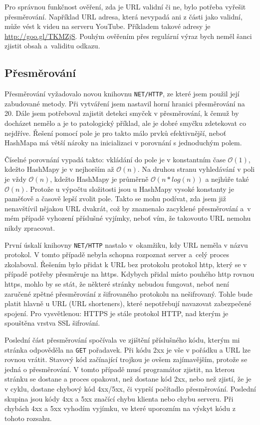 \par Pro správnou funkčnost ověření, zda je URL validní či ne, bylo potřeba vyřešit přesměrování. Například URL adresa, která nevypadá ani z části jako validní, může vést k videu na serveru YouTube. Příkladem takové adresy je \url{http://goo.gl/TKMZjS}. Pouhým ověřením přes regulární výraz bych neměl šanci zjistit obsah a~validitu odkazu. 

\subsection{Přesměrování}
\par Přesměrování\cite{nethttp} vyžadovalo novou knihovnu \texttt{NET/HTTP}, ze které jsem použil její zabudované metody. Při vytváření jsem nastavil horní hranici přesměrování na 20. Dále jsem potřeboval zajistit detekci smyček v přesměrování, k čemuž by docházet nemělo a je to patologický příklad, ale je dobré smyčku zdetekovat co nejdříve. Řešení pomocí pole je pro takto málo prvků efektivnější, neboť HashMapa má větší nároky na inicializaci v porovnání s jednoduchým polem. 
\par Číselné porovnání vypadá takto: vkládání do pole je v konstantním čase $\mathcal{O}(1)$, kdežto HashMapy je v nejhorším až $\mathcal{O}(n)$. Na druhou stranu vyhledávání v poli je vždy $\mathcal{O}(n)$, kdežto HashMapy je průměrně $\mathcal{O}(n * log(n))$ a nejhůře také $\mathcal{O}(n)$. Protože u výpočtu složitosti jsou u HashMapy vysoké konstanty je paměťově a časově lepší zvolit pole. Takto se mohu podívat, zda jsem již nenavštívil nějakou URL dvakrát, což by znamenalo zacyklené přesměrování a~v mém případě vyhození příslušné vyjímky, neboť vím, že takovouto URL nemohu nikdy zpracovat.

\par První úskalí knihovny \texttt{NET/HTTP}\cite{nethttp} nastalo v~okamžiku, kdy URL neměla v názvu protokol. V tomto případě nebyla schopna rozpoznat server a~celý proces zkolaboval. Řešením bylo přidat k URL bez protokolu protokol http, který se v případě potřeby přesměruje na https. Kdybych přidal místo pouhého http rovnou https, mohlo by se stát, že některé stránky nebudou fungovat, neboť není zaručené zpětné přesměrování z šifrovaného protokolu na nešifrovaný. Tohle bude platit hlavně u  URL (URL shorteners), které nepotřebují navazovat zabezpečené spojení. Pro vysvětlenou: HTTPS je stále protokol HTTP, nad kterým je spouštěna vrstva SSL šifrování.
\par Poslední část přesměrování spočívala ve zjištění příslušného kódu, kterým mi stránka odpověděla na \texttt{GET} pořadavek. Při kódu 2xx je vše v pořádku a URL lze rovnou vrátit. Stavový kód začínající trojkou je ovšem zajímavějším, protože se jedná o přesměrování. V tomto případě musí programátor zjistit, na kterou stránku se dostane a proces opakovat, než dostane kód 2xx, nebo než zjistí, že je v cyklu, dostane chybový kód 4xx/5xx, či vyprší počítadlo přesměrování. Poslední skupina jsou kódy 4xx a 5xx značící chybu klienta nebo chybu serveru. Při chybách 4xx a 5xx vyhodím vyjímku, ve které uporozním na výskyt kódu z tohoto rozsahu.

